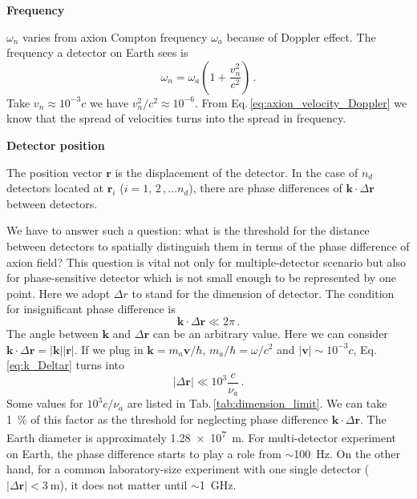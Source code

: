 \textbf{Frequency}

$\omega_n$ varies from axion Compton frequency $\omega_a$ because of Doppler effect. The frequency a detector on Earth sees is
\begin{equation}\label{eq:axion_velocity_Doppler}
    \omega_n = \omega_a \left(1 + \dfrac{v_n^2}{c^2}\right)\,. 
\end{equation}
Take $v_n \approx 10^{-3}c$ we have $v_n^2/c^2 \approx 10^{-6}$. 
From Eq.\,\eqref{eq:axion_velocity_Doppler} we know that the spread of velocities turns into the spread in frequency.  
    
\textbf{Detector position}
    
The position vector $\mathbf{r}$ is the displacement of the detector. In the case of $n_d$ detectors located at $\mathbf{r}_{i}$ ($i = 1,\,2\,, \ldots n_d$), there are phase differences of $\mathbf{k} \cdot \Delta \mathbf{r}$ between detectors. 

We have to answer such a question: what is the threshold for the distance between detectors to spatially distinguish them in terms of the phase difference of axion field? This question is vital not only for multiple-detector scenario but also for phase-sensitive detector which is not small enough to be represented by one point. Here we adopt $\Delta r$ to stand for the dimension of detector. The condition for insignificant phase difference is
\begin{equation}
    \mathbf{k} \cdot \Delta \mathbf{r} \ll 2\pi\,.\label{eq:k_Deltar}
\end{equation}
The angle between $\mathbf{k}$ and $\Delta \mathbf{r}$ can be an arbitrary value. Here we can consider $\mathbf{k} \cdot \Delta \mathbf{r} = |\mathbf{k}| |\mathbf{r}|$. If we plug in $\mathbf{k} = m_a \mathbf{v}/\hbar$, $m_a/\hbar = \omega/c^2$ and $|\mathbf{v}|\sim10^{-3}c$, Eq.\,\eqref{eq:k_Deltar} turns into
\begin{equation}
    |\Delta \mathbf{r}| \ll 10^{3} \dfrac{c}{\nu_a}\,. \label{eq:dimension_limit_condition}
\end{equation}
Some values for $10^{3} c/\nu_a$ are listed in Tab.\,\ref{tab:dimension_limit}. We can take \SI{1}{\percent} of this factor as the threshold for neglecting phase difference $\mathbf{k} \cdot \Delta \mathbf{r}$. The Earth diameter is approximately \SI{1.28e7}{\metre}. For multi-detector experiment on Earth, the phase difference starts to play a role from $\sim$\SI{100}{\Hz}. On the other hand, for a common laboratory-size experiment with one single detector ($|\Delta \mathbf{r}| < \SI{3}{\metre}$), it does not matter until $\sim$\SI{1}{\GHz}. 

